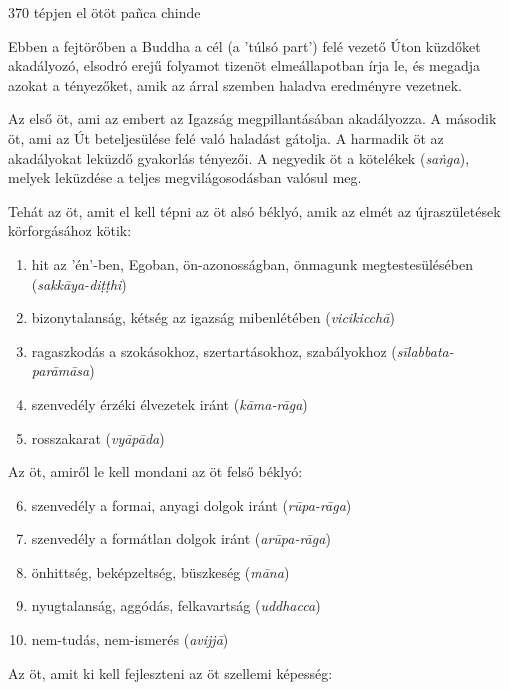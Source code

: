 
\begin{notesdescription}

\item[{370}
{tépjen el ötöt}
{pañca chinde}] \hfill\par

Ebben a fejtörőben a Buddha a cél (a 'túlsó part') felé vezető Úton küzdőket akadályozó, elsodró erejű folyamot tizen\-öt elme\-állapotban írja le, és megadja azokat a tényezőket, amik az árral szemben haladva eredményre vezetnek.

Az első öt, ami az embert az Igazság megpillantásában akadályozza. A második öt, ami az Út beteljesülése felé való haladást gátolja. A harmadik öt az akadályokat leküzdő gyakorlás tényezői. A negyedik öt a kötelékek (\textit{saṅga}), melyek leküzdése a teljes megvilágosodásban valósul meg.

Tehát az öt, amit el kell tépni az öt alsó béklyó, amik az elmét az újraszületések körforgásához kötik:

\begin{enumerate}
\item hit az 'én'-ben, Egoban, ön-azonosságban, önmagunk megtestesülésében (\textit{sakkāya-diṭṭhi})
\item bizonytalanság, kétség az igazság mibenlétében (\textit{vicikicchā})
\item ragaszkodás a szokásokhoz, szertartásokhoz, szabályokhoz (\textit{sīlabbata-parāmāsa})
\item szenvedély érzéki élvezetek iránt (\textit{kāma-rāga})
\item rosszakarat (\textit{vyāpāda})
\end{enumerate}

Az öt, amiről le kell mondani az öt felső béklyó:

\begin{enumerate}
\setcounter{enumi}{5}
\item szenvedély a formai, anyagi dolgok iránt (\textit{rūpa-rāga})
\item szenvedély a formátlan dolgok iránt (\textit{arūpa-rāga})
\item önhittség, beképzeltség, büszkeség (\textit{māna})
\item nyugtalanság, aggódás, felkavartság (\textit{uddhacca})
\item nem-tudás, nem-ismerés (\textit{avijjā})
\end{enumerate}

Az öt, amit ki kell fejleszteni az öt szellemi képesség:


\end{notesdescription}
